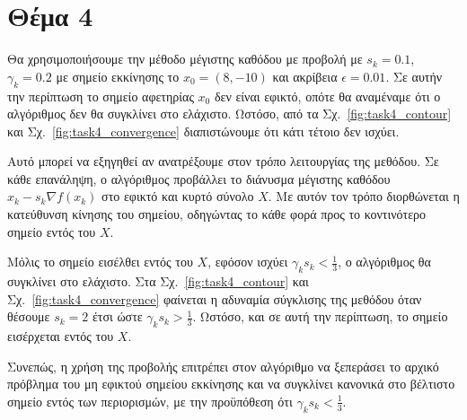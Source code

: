\documentclass[a4paper,12pt]{article}
\begin{document}
\section*{Θέμα 4}
Θα χρησιμοποιήσουμε την μέθοδο μέγιστης καθόδου με προβολή με $s_k = 0.1$, $\gamma_k = 0.2$ με σημείο εκκίνησης το 
$x_0 = (8, -10)$ και ακρίβεια $\epsilon = 0.01$. Σε αυτήν την περίπτωση το σημείο αφετηρίας $x_0$ δεν είναι εφικτό,
οπότε θα αναμέναμε ότι ο αλγόριθμος δεν θα συγκλίνει στο ελάχιστο. Ωστόσο, από τα Σχ.~\ref{fig:task4_contour} και
Σχ.~\ref{fig:task4_convergence} διαπιστώνουμε ότι κάτι τέτοιο δεν ισχύει.

Αυτό μπορεί να εξηγηθεί αν ανατρέξουμε στον τρόπο λειτουργίας της μεθόδου. Σε κάθε επανάληψη, ο αλγόριθμος προβάλλει
το διάνυσμα μέγιστης καθόδου $x_k - s_k \nabla f(x_k)$ στο εφικτό και κυρτό σύνολο $X$. Με αυτόν τον τρόπο διορθώνεται 
η κατεύθυνση κίνησης του σημείου, οδηγώντας το κάθε φορά προς το κοντινότερο σημείο εντός του $X$.

Μόλις το σημείο εισέλθει εντός του $X$, εφόσον ισχύει $\gamma_k s_k < \frac{1}{3}$, ο αλγόριθμος θα συγκλίνει στο 
ελάχιστο. Στα Σχ.~\ref{fig:task4_contour} και Σχ.~\ref{fig:task4_convergence} φαίνεται η αδυναμία σύγκλισης της μεθόδου
όταν θέσουμε $s_k = 2$ έτσι ώστε $\gamma_k s_k > \frac{1}{3}$. Ωστόσο, και σε αυτή την περίπτωση, το σημείο εισέρχεται
εντός του $X$.

Συνεπώς, η χρήση της προβολής επιτρέπει στον αλγόριθμο να ξεπεράσει το αρχικό πρόβλημα του μη εφικτού σημείου εκκίνησης 
και να συγκλίνει κανονικά στο βέλτιστο σημείο εντός των περιορισμών, με την προϋπόθεση ότι $\gamma_k s_k < \frac{1}{3}$.
\end{document}
